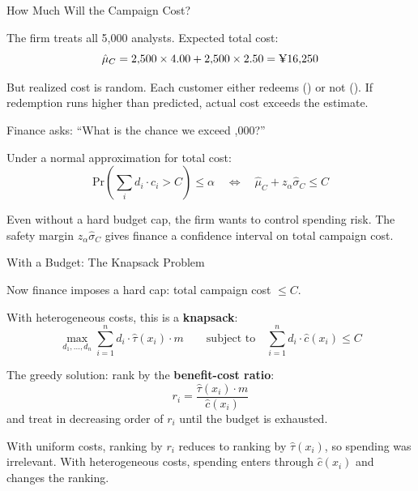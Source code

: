 \documentclass[aspectratio=169, 11pt, handout]{beamer}
\newcommand{\Prob}{\mathrm{Pr}}
\begin{document}
 
\begin{frame}{How Much Will the Campaign Cost?}
 
The firm treats all 5,000 analysts. Expected total cost:
\[
\hat{\mu}_C = 2{,}500 \times 4.00 + 2{,}500 \times 2.50 = \text{\textyen}16{,}250
\]
 
\pause
\medskip
 
But realized cost is random. Each customer either redeems () or not (). If redemption runs higher than predicted, actual cost exceeds the estimate.
 
\pause
\medskip
 
Finance asks: ``What is the chance we exceed ,000?''
 
\medskip
 
Under a normal approximation for total cost:
\[
\Prob\!\left(\sum_{i} d_i \cdot c_i > C\right) \leq \alpha \quad \Longleftrightarrow \quad \hat{\mu}_C + z_\alpha \hat{\sigma}_C \leq C
\]
 
\pause
\medskip
 
Even without a hard budget cap, the firm wants to control spending risk. The safety margin $z_\alpha \hat{\sigma}_C$ gives finance a confidence interval on total campaign cost.
 
\end{frame}
 
 
\begin{frame}{With a Budget: The Knapsack Problem}
 
Now finance imposes a hard cap: total campaign cost $\leq C$.
 
\bigskip
 
With heterogeneous costs, this is a \textbf{knapsack}:
\[
\max_{d_1, \ldots, d_n} \sum_{i=1}^{n} d_i \cdot \hat{\tau}(x_i) \cdot m \qquad \text{subject to} \quad \sum_{i=1}^{n} d_i \cdot \hat{c}(x_i) \leq C
\]
 
\pause
\bigskip
 
The greedy solution: rank by the \textbf{benefit-cost ratio}:
\[
r_i = \frac{\hat{\tau}(x_i) \cdot m}{\hat{c}(x_i)}
\]
and treat in decreasing order of $r_i$ until the budget is exhausted.
 
\pause
\bigskip
 
With uniform costs, ranking by $r_i$ reduces to ranking by $\hat{\tau}(x_i)$, so spending was irrelevant. With heterogeneous costs, spending enters through $\hat{c}(x_i)$ and changes the ranking.
 
\end{frame}
 
\end{document}
